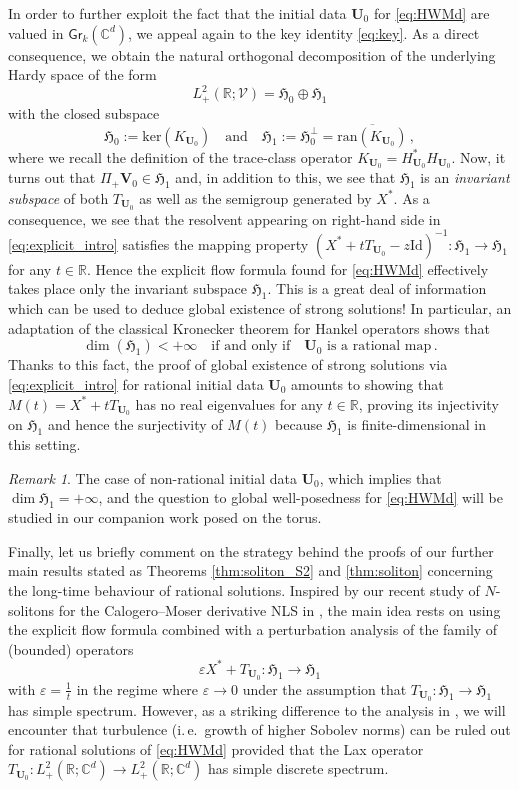 \documentclass[11pt,reqno]{amsart}
\theoremstyle{definition}
\theoremstyle{remark}
\theoremstyle{remark}
\newtheorem*{remark*}{Remark}
\numberwithin{equation}{section}
\newcommand{\Hfr}{\mathfrak{H}}
\newcommand{\C}{\mathbb{C}}
\newcommand{\R}{\mathbb{R}}
\newcommand{\VV}{\mathcal{V}}
\newcommand{\ran}{\mathrm{ran}}
\renewcommand{\ker}{\mathrm{ker}}
\newcommand{\eps}{\varepsilon}
\newcommand{\Vb}{\mathbf{V}}
\newcommand{\Ub}{\mathbf{U}}
\newcommand{\id}{\mathrm{Id}}
\newcommand{\Gr}{\mathsf{Gr}}
\begin{document}
\medskip
In order to further exploit the fact that the initial data $\Ub_0$ for \eqref{eq:HWMd} are valued in $\Gr_k(\C^d)$, we appeal again to the key identity \eqref{eq:key}. As a direct consequence, we obtain the natural orthogonal decomposition of the underlying Hardy space of the form
$$
L^2_+(\R; \VV) = \Hfr_0 \oplus \Hfr_1 
$$
with the closed subspace
$$
\Hfr_0 := \ker(K_{\Ub_0}) \quad \mbox{and} \quad \Hfr_1 := \Hfr_0^\perp = \overline{\ran(K_{\Ub_0})} \, ,
$$
where we recall the definition of the trace-class operator $K_{\Ub_0}=H_{\Ub_0}^* H_{\Ub_0}$. Now, it turns out that $\Pi_+ \Vb_0 \in \Hfr_1$ and, in addition to this, we see that $\Hfr_1$ is an {\em invariant subspace} of both $T_{\Ub_0}$ as well as the semigroup generated by $X^*$. As a consequence, we see that the resolvent appearing on right-hand side in \eqref{eq:explicit_intro} satisfies the mapping property $(X^* + t T_{\Ub_0} - z \id)^{-1} : \Hfr_1 \to \Hfr_1$ for any $t \in \R$. Hence the explicit flow formula found for \eqref{eq:HWMd} effectively takes place only the invariant subspace $\Hfr_1$. This is a great deal of information which can be used to deduce global existence of strong solutions! In particular, an adaptation of the classical Kronecker theorem for Hankel operators shows that 
$$
\dim(\Hfr_1) < +\infty \quad \mbox{if and only if} \quad \mbox{$\Ub_0$ is a rational map} \, . 
$$
Thanks to this fact, the proof of global existence of strong solutions via \eqref{eq:explicit_intro} for rational initial data $\Ub_0$ amounts to showing that $M(t)=X^* + t T_{\Ub_0}$ has no real eigenvalues for any $t \in \R$, proving its injectivity on $\Hfr_1$ and hence the surjectivity of $M(t)$ because $\Hfr_1$ is finite-dimensional in this setting.

\begin{remark*}
The case of non-rational initial data $\Ub_0$, which implies that $\dim \Hfr_1 = +\infty$, and the question to global well-posedness for \eqref{eq:HWMd} will be studied in our companion work \cite{GeLe-24b} posed on the torus.
\end{remark*}

Finally, let us briefly comment on the strategy behind the proofs of our further main results stated as Theorems \ref{thm:soliton_S2} and \ref{thm:soliton} concerning the long-time behaviour of rational solutions. Inspired by our recent study of $N$-solitons for the Calogero--Moser derivative NLS in \cite{GeLe-24},  the main idea rests on using the explicit flow formula combined with a perturbation analysis of the family of (bounded) operators
$$
\eps X^* + T_{\Ub_0} : \Hfr_1 \to \Hfr_1
$$
with $\eps = \frac{1}{t}$ in the regime where $\eps \to 0$ under the assumption that $T_{\Ub_0} : \Hfr_1 \to \Hfr_1$ has simple spectrum. However, as a striking difference to the analysis in \cite{GeLe-24}, we will encounter that turbulence (i.\,e.~growth of higher Sobolev norms) can be ruled out for rational solutions of \eqref{eq:HWMd} provided that the Lax operator $T_{\Ub_0} : L^2_+(\R; \C^d) \to L^2_+(\R; \C^d)$ has simple discrete spectrum.
\end{document}
